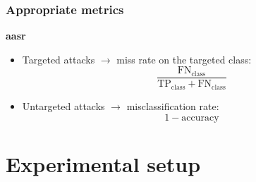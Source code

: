 \documentclass[color,t,presentation,english,aspectratio=169]{beamer}
\begin{document}
\begin{frame}
	\frametitle{Appropriate metrics}
	
	\textbf{\Acrfull{aasr}}\vspace{.5ex}

	\begin{itemize}
		\item Targeted attacks $\rightarrow$ miss rate on the targeted class:\vspace{.5ex}
		\begin{equation*}
			\frac{
				\text{FN}_\text{class}
			}{
				\text{TP}_\text{class} + \text{FN}_\text{class}
			}
		\end{equation*}\vspace{.5ex}

		\item Untargeted attacks $\rightarrow$ misclassification rate:\vspace{.5ex}
		\begin{equation*}
			1 - \text{accuracy}
		\end{equation*}

	\end{itemize}

\end{frame}


\section{Experimental setup}
\end{document}
